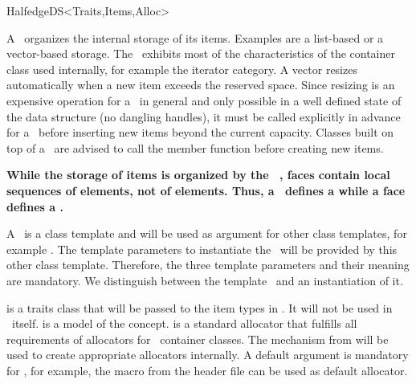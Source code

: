 \begin{ccRefConcept}{HalfedgeDS<Traits,Items,Alloc>}


A \ccRefName\ organizes the internal storage of its items.  Examples
are a list-based or a vector-based storage. The \ccRefName\ exhibits
most of the characteristics of the container class used internally,
for example the iterator category. A vector resizes
automatically when a new item exceeds the reserved space. Since
resizing is an expensive operation for a \ccRefName\ in general and
only possible in a well defined state of the data structure (no
dangling handles), it must be called explicitly in advance for a
\ccRefName\ before inserting new items beyond the current capacity.
Classes built on top of a \ccRefName\ are advised to call the
 member function before creating new items.

{\bf\ttfamily
While the storage of  items is organized by the \ccRefName\ , faces contain 
local sequences of  elements, not of  elements. Thus,
a \ccRefName\ defines a  while a face defines a
.
}

\ccParameters

A \ccRefName\ is a class template and will be used as argument for
other class templates, for example . The
template parameters to instantiate the \ccRefName\ will be provided by
this other class template. Therefore, the three template parameters
and their meaning are mandatory. We distinguish between the template
\ccRefName\ and an instantiation of it.

 is a traits class that will be passed to the 
item types in . It will not be used in \ccRefName\
itself.  is a model of the  concept.
\ccc{Alloc} is a standard allocator that fulfills all requirements 
of allocators for \stl\ container classes. The  \ccc{rebind}
mechanism from  will be used to create appropriate 
allocators internally. A default argument is mandatory for
\ccc{Alloc}, for example, the macro 
from the  header file can be used as default
allocator.

\ccTypes


\ccGlue
{}


\end{ccRefConcept}

